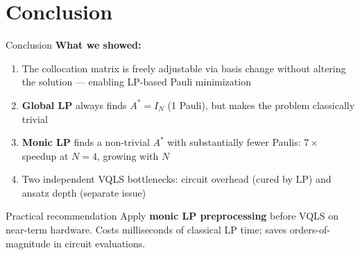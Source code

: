 \documentclass{beamer}
\begin{document}
\section{Conclusion}

\begin{frame}{Conclusion}
  \small
  \textbf{What we showed:}
  \begin{enumerate}\setlength\itemsep{3pt}
    \item The collocation matrix is freely adjustable via basis change
          without altering the solution — enabling LP-based Pauli minimization
    \item \textbf{Global LP} always finds $A^*=I_N$ (1 Pauli), but
          makes the problem classically trivial
    \item \textbf{Monic LP} finds a non-trivial $A^*$ with substantially fewer Paulis:
          $7\times$ speedup at $N=4$, growing with $N$
    \item Two independent VQLS bottlenecks: circuit overhead (cured by LP)
          and ansatz depth (separate issue)
  \end{enumerate}

  \vspace{6pt}
  \begin{block}{Practical recommendation}
    \small Apply \textbf{monic LP preprocessing} before VQLS on near-term hardware.
    Costs milliseconds of classical LP time; saves orders-of-magnitude in circuit evaluations.
  \end{block}
\end{frame}
\end{document}
